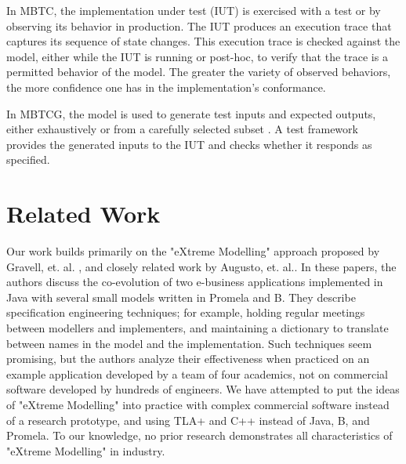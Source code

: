 \documentclass{vldb}
\begin{document}
In MBTC, the implementation under test (IUT) is exercised with a test or by observing its behavior in production.
The IUT produces an execution trace that captures its sequence of state changes.
This execution trace is checked against the model, either while the IUT is running or post-hoc, to verify that the trace is a permitted behavior of the model.
The greater the variety of observed behaviors, the more confidence one has in the implementation's conformance.

In MBTCG, the model is used to generate test inputs and expected outputs, either exhaustively or from a carefully selected subset \cite{Dick93AutomatingGenerationOfTests}.
A test framework provides the generated inputs to the IUT and checks whether it responds as specified.


\section{Related Work}
\label{sec:related_work}


Our work builds primarily on the "eXtreme Modelling" approach proposed by Gravell, et. al. \cite{Gravell11ConcurrentDevelopmentOfModelAndImplementation}, and closely related work by Augusto, et. al.\cite{Augusto03ValidatingBusinessSystems}. 
In these papers, the authors discuss the co-evolution of two e-business applications implemented in Java with several small models written in Promela and B.
They describe specification engineering techniques; for example, holding regular meetings between modellers and implementers, and maintaining a dictionary to translate between names in the model and the implementation.
Such techniques seem promising, but the authors analyze their effectiveness when practiced on an example application developed by a team of four academics, not on commercial software developed by hundreds of engineers.
We have attempted to put the ideas of "eXtreme Modelling" into practice with complex commercial software instead of a research prototype, and using TLA+ and C++ instead of Java, B, and Promela.
To our knowledge, no prior research demonstrates all characteristics of "eXtreme Modelling" in industry.
\end{document}
